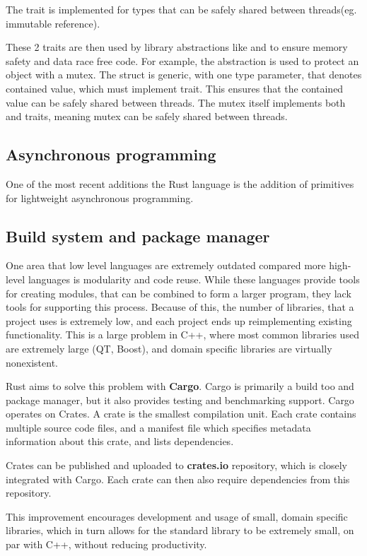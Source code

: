 The  trait is implemented for types that can be safely shared between threads(eg. immutable reference).

These 2 traits are then used by library abstractions like  and  to ensure memory safety and data race free code.
For example, the  abstraction is used to protect an object with a mutex. The  struct is generic,
with one type parameter, that denotes contained value, which must implement  trait.
This ensures that the contained value can be safely shared between threads. The mutex itself implements both  and  traits,
meaning mutex can be safely shared between threads.

\subsection{Asynchronous programming}
One of the most recent additions the Rust language is the addition of primitives for lightweight asynchronous programming.

\subsection{Build system and package manager}
One area that low level languages are extremely outdated compared more high-level languages is modularity and code reuse.
While these languages provide tools for creating modules, that can be combined to form a larger program, they lack tools
for supporting this process. Because of this, the number of libraries, that a project uses is extremely low, and
each project ends up reimplementing existing functionality. This is a large problem in C++, where most common
libraries used are extremely large (QT, Boost), and domain specific libraries are virtually nonexistent.

Rust aims to solve this problem with \textbf{Cargo}. Cargo is primarily a build too and package manager, but it also
provides testing and benchmarking support. Cargo operates on Crates. A crate is the smallest compilation unit.
Each crate contains multiple source code files, and a manifest file which specifies metadata information about this crate, and lists dependencies.

Crates can be published and uploaded to \textbf{crates.io} repository, which is closely integrated with Cargo. Each crate can then
also require dependencies from this repository.

This improvement encourages development and usage of small, domain specific libraries, which in
turn allows for the standard library to be extremely small, on par with C++, without reducing productivity.

